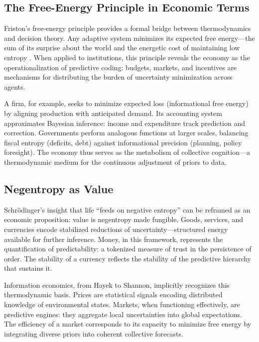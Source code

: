 \documentclass[11pt,a4paper]{article}
\begin{document}
\subsection{The Free-Energy Principle in Economic Terms}

Friston’s free-energy principle provides a formal bridge between thermodynamics and decision theory.  Any adaptive system minimizes its expected free energy—the sum of its surprise about the world and the energetic cost of maintaining low entropy \citep{Friston2013LifeAsWeKnowIt}.  When applied to institutions, this principle reveals the economy as the operationalization of predictive coding: budgets, markets, and incentives are mechanisms for distributing the burden of uncertainty minimization across agents.

A firm, for example, seeks to minimize expected loss (informational free energy) by aligning production with anticipated demand.  Its accounting system approximates Bayesian inference: income and expenditure track prediction and correction.  Governments perform analogous functions at larger scales, balancing fiscal entropy (deficits, debt) against informational precision (planning, policy foresight).  The economy thus serves as the metabolism of collective cognition—a thermodynamic medium for the continuous adjustment of priors to data.

\subsection{Negentropy as Value}

Schrödinger’s insight that life “feeds on negative entropy” \citep{Schrodinger1944WhatIsLife} can be reframed as an economic proposition: value is negentropy made fungible.  Goods, services, and currencies encode stabilized reductions of uncertainty—structured energy available for further inference.  Money, in this framework, represents the quantification of predictability: a tokenized measure of trust in the persistence of order.  The stability of a currency reflects the stability of the predictive hierarchy that sustains it.

Information economics, from Hayek to Shannon, implicitly recognizes this thermodynamic basis.  Prices are statistical signals encoding distributed knowledge of environmental states.  Markets, when functioning effectively, are predictive engines: they aggregate local uncertainties into global expectations.  The efficiency of a market corresponds to its capacity to minimize free energy by integrating diverse priors into coherent collective forecasts.
\end{document}
